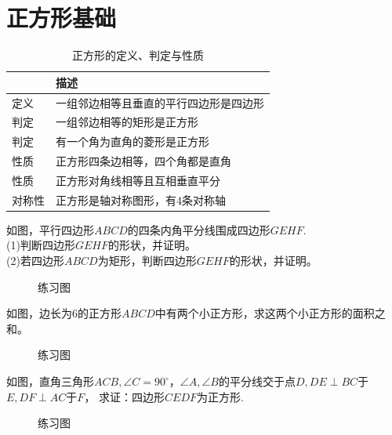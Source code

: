 \section{正方形基础}
\begin{table}[H]
    \centering
    \caption{正方形的定义、判定与性质}
    \begin{tabular}{|l|l|}
        \hline
            & 描述                  \\
        \hline
        定义  & 一组邻边相等且垂直的平行四边形是四边形 \\
        \hline
        判定  & 一组邻边相等的矩形是正方形       \\
        \hline
        判定  & 有一个角为直角的菱形是正方形      \\
        \hline
        性质  & 正方形四条边相等，四个角都是直角    \\
        \hline
        性质  & 正方形对角线相等且互相垂直平分     \\
        \hline
        对称性 & 正方形是轴对称图形，有4条对称轴    \\
        \hline
    \end{tabular}
\end{table}
\begin{problem}
如图，平行四边形$ABCD$的四条内角平分线围成四边形$GEHF$. \\
(1)判断四边形$GEHF$的形状，并证明。\\
(2)若四边形$ABCD$为矩形，判断四边形$GEHF$的形状，并证明。\\
\end{problem}
\begin{figure}[H]
    \centering
    \resizebox{4cm}{!}{}
    \caption{练习图}
\end{figure}
\begin{problem}
如图，边长为6的正方形$ABCD$中有两个小正方形，求这两个小正方形的面积之和。
\end{problem}
\begin{figure}[H]
    \centering
    \resizebox{4cm}{!}{}
    \caption{练习图}
\end{figure}
\begin{problem}
如图，直角三角形$ACB,\angle C=90^\circ$，$\angle A,\angle B$的平分线交于点$D,DE\perp BC$于$E,DF\perp AC$于$F$，
求证：四边形$CEDF$为正方形.
\end{problem}
\begin{figure}[H]
    \centering
    \resizebox{4cm}{!}{}
    \caption{练习图}
\end{figure}
